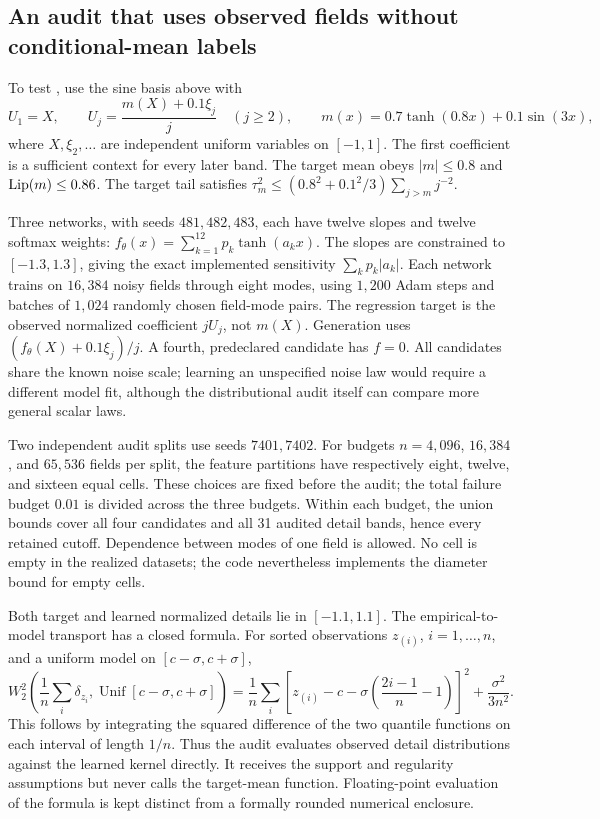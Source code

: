 \subsection{An audit that uses observed fields without conditional-mean labels}
To test , use the sine basis above with
\begin{equation}\label{eq:bounded-observed-field}
 U_1=X,\qquad U_j=\frac{m(X)+0.1\xi_j}{j}\quad(j\ge2),\qquad
 m(x)=0.7\tanh(0.8x)+0.1\sin(3x),
\end{equation}
where $X,\xi_2,\ldots$ are independent uniform variables on $[-1,1]$.
The first coefficient is a sufficient context for every later band. The target mean obeys $|m|\le0.8$ and $\operatorname{Lip}(m)\le0.86$. The target tail satisfies
$\tau_m^2\le(0.8^2+0.1^2/3)\sum_{j>m}j^{-2}$.

Three networks, with seeds $481,482,483$, each have twelve slopes and twelve softmax weights:
$f_\theta(x)=\sum_{k=1}^{12}p_k\tanh(a_kx)$.
The slopes are constrained to $[-1.3,1.3]$, giving the exact implemented sensitivity $\sum_kp_k|a_k|$. Each network trains on $16{,}384$ noisy fields through eight modes, using $1{,}200$ Adam steps and batches of $1{,}024$ randomly chosen field-mode pairs. The regression target is the observed normalized coefficient $jU_j$, not $m(X)$. Generation uses $(f_\theta(X)+0.1\xi_j)/j$. A fourth, predeclared candidate has $f=0$. All candidates share the known noise scale; learning an unspecified noise law would require a different model fit, although the distributional audit itself can compare more general scalar laws.

Two independent audit splits use seeds $7401,7402$. For budgets $n=4{,}096$, $16{,}384$, and $65{,}536$ fields per split, the feature partitions have respectively eight, twelve, and sixteen equal cells. These choices are fixed before the audit; the total failure budget $0.01$ is divided across the three budgets. Within each budget, the union bounds cover all four candidates and all 31 audited detail bands, hence every retained cutoff. Dependence between modes of one field is allowed. No cell is empty in the realized datasets; the code nevertheless implements the diameter bound for empty cells.

Both target and learned normalized details lie in $[-1.1,1.1]$. The empirical-to-model transport has a closed formula. For sorted observations $z_{(i)}$, $i=1,\ldots,n$, and a uniform model on $[c-\sigma,c+\sigma]$,
\begin{equation}\label{eq:empirical-uniform}
 W_2^2\!\left(\frac1n\sum_i\delta_{z_i},\operatorname{Unif}[c-\sigma,c+\sigma]\right)
 =\frac1n\sum_i\left[z_{(i)}-c-\sigma\left(\frac{2i-1}{n}-1\right)\right]^2
 +\frac{\sigma^2}{3n^2}.
\end{equation}
This follows by integrating the squared difference of the two quantile functions on each interval of length $1/n$. Thus the audit evaluates observed detail distributions against the learned kernel directly. It receives the support and regularity assumptions but never calls the target-mean function. Floating-point evaluation of the formula is kept distinct from a formally rounded numerical enclosure.

